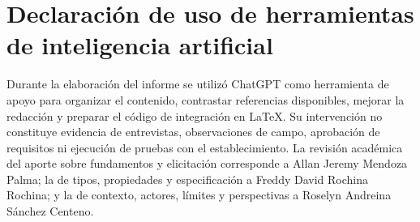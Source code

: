 \documentclass[onecolumn,12pt,a4paper]{IEEEtran}
\begin{document}
\clearpage
\section*{Declaración de uso de herramientas de inteligencia artificial}
Durante la elaboraci\'on del informe se utiliz\'o ChatGPT como herramienta de apoyo para organizar el contenido, contrastar referencias disponibles, mejorar la redacci\'on y preparar el c\'odigo de integraci\'on en LaTeX. Su intervenci\'on no constituye evidencia de entrevistas, observaciones de campo, aprobaci\'on de requisitos ni ejecuci\'on de pruebas con el establecimiento. La revisi\'on acad\'emica del aporte sobre fundamentos y elicitaci\'on corresponde a Allan Jeremy Mendoza Palma; la de tipos, propiedades y especificaci\'on a Freddy David Rochina Rochina; y la de contexto, actores, l\'imites y perspectivas a Roselyn Andreina S\'anchez Centeno. 
\end{document}
